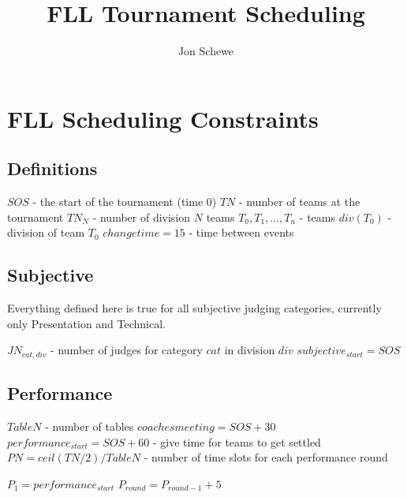 \documentclass[letterpaper,11pt]{report}
\title{FLL Tournament Scheduling}
\author{Jon Schewe}
\begin{document}
\maketitle

\chapter{FLL Scheduling Constraints}

\section{Definitions}

\begin{algorithmic}
\STATE $SOS$ - the start of the tournament (time 0)
\STATE $TN$ - number of teams at the tournament
\STATE $TN_{N}$ - number of division $N$ teams
\STATE $T_{0}, T_{1}, \dots, T_{n}$ - teams
\STATE $div(T_{0})$ - division of team $T_{0}$
\STATE $changetime = 15$ - time between events
\end{algorithmic}


\section{Subjective}

Everything defined here is true for all subjective judging categories, currently only Presentation and Technical.

\begin{algorithmic}
\STATE $JN_{cat,div}$ - number of judges for category $cat$ in division $div$
\STATE $subjective_{start} = SOS$
\end{algorithmic}

\section{Performance}
\begin{algorithmic}
\STATE $TableN$ - number of tables
\STATE $coaches meeting = SOS + 30$
\STATE $performance_{start} = SOS + 60$ - give time for teams to get settled
\STATE $PN = ceil(TN / 2) / TableN$ - number of time slots for each performance round
\end{algorithmic}

\begin{algorithmic}
\STATE $P_{1} = performance_{start}$
  \STATE $P_{round} = P_{round-1} + 5$
\ENDFOR
\end{algorithmic}
\end{document}
